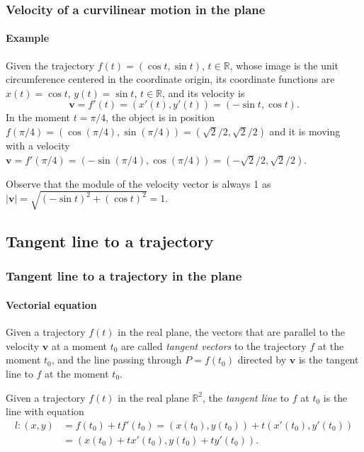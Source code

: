 \begin{frame}
\frametitle{Velocity of a curvilinear motion in the plane}
\framesubtitle{Example}
Given the trajectory $f(t) = (\cos t,\sin t)$, $t\in \mathbb{R}$, whose image is the unit circumference centered in the coordinate origin, its coordinate functions are $x(t) = \cos t$, $y(t) = \sin t$, $t\in \mathbb{R}$, and its velocity is
\[
\mathbf{v}=f'(t)=(x'(t),y'(t))=(-\sin t, \cos t).
\]
In the moment $t=\pi/4$, the object is in position $f(\pi/4) = (\cos(\pi/4),\sin(\pi/4)) =(\sqrt{2}/2,\sqrt{2}/2)$
and it is moving with a velocity $\mathbf{v}=f'(\pi/4)=(-\sin(\pi/4),\cos(\pi/4))=(-\sqrt{2}/2,\sqrt{2}/2)$.
\begin{center}
\end{center}
Observe that the module of the velocity vector is always 1 as
$|\mathbf{v}|=\sqrt{(-\sin t)^2+(\cos t)^2}=1$.
\end{frame}



\subsection{Tangent line to a trajectory}
\begin{frame}
\frametitle{Tangent line to a trajectory in the plane}
\framesubtitle{Vectorial equation}
Given a trajectory $f(t)$ in the real plane, the vectors that are parallel to the velocity $\mathbf{v}$ at a moment $t_0$ are called \emph{tangent vectors} to the trajectory $f$ at the moment $t_0$, and the line passing through $P=f(t_0)$ directed by $\mathbf{v}$ is the tangent line to $f$ at the moment $t_0$.

\begin{definition}
Given a trajectory $f(t)$ in the real plane $\mathbb{R}^2$, the \emph{tangent line} to $f$ at $t_0$ is the line with equation
\begin{align*}
l:(x,y) &= f(t_0)+tf'(t_0) = (x(t_0),y(t_0))+t(x'(t_0),y'(t_0))\\
& = (x(t_0)+tx'(t_0),y(t_0)+ty'(t_0)).
\end{align*}
\end{definition}
\end{frame}


